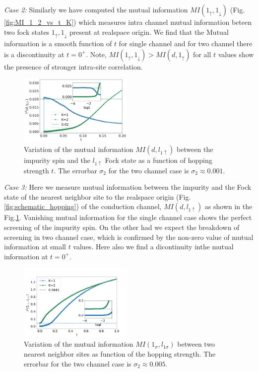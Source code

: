 \documentclass[reprint,prb,superscriptaddress]{revtex4-2}
\begin{document}
\par\textit{Case 2:} Similarly we have computed the mutual information $MI(1_{\uparrow},1_{\downarrow})$ (Fig.\ref{fig:MI_1_2_vs_t_K}) which measures intra channel  mutual information beteen two fock states $1_{\uparrow},1_{\downarrow}$ present at realspace origin. We find that the Mutual information is a smooth function of $t$ for single channel and for two channel there is a discontinuity at $t=0^{+}$. Note, $MI(1_{\uparrow},1_{\downarrow})>MI(d,1_{\uparrow})$ for all $t$ values show the presence of stronger intra-site correlation.
\begin{figure}
\includegraphics[width=0.49\textwidth]{plt/A_I2_ch12_['d','l1_up']}
\caption{Variation of the mutual information $MI(d,l_{1\uparrow})$ between the impurity spin and the $l_{1\uparrow}$ Fock state as a function of hopping strength $t$. The errorbar $\sigma_2$ for the two channel case is $\sigma_2\approx 0.001$.}
\label{fig:MI_d_l1}
\end{figure}
\par \textit{Case 3:} Here we measure mutual information between the impurity and the Fock state of the nearest neighbor site to the realspace origin (Fig.\ref{fig:schematic_hopping}) of the conduction channel, $MI(d,l_{1\uparrow})$ as shown in the Fig.\ref{fig:MI_d_l1}. Vanishing mutual information for the single channel case shows the perfect screening of the impurity spin. On the other had we expect the breakdown of screening in two channel case, which is confirmed by the non-zero value of mutual information at small $t$ values. Here also we find a dicontinuity inthe mutual information at $t=0^+$.
\begin{figure}[!htpb]
\includegraphics[width=0.49\textwidth]{plt/A_I2_ch12_['1','l1']}
\caption{Variation of the mutual information $MI(1_{\sigma},l_{1\sigma})$ between two nearest neighbor sites as function of the hopping strength. The errorbar for the two channel case is $\sigma_2\approx 0.005$.}
\label{fig:MI_l_l1}
\end{figure}
\end{document}
